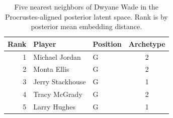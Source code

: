 \begin{table}[htbp]
  \centering\small
  \begin{tabular}{rllc}
    \toprule
    Rank & Player & Position & Archetype \\
    \midrule
    1 & Michael Jordan & G & 2 \\
    2 & Monta Ellis & G & 2 \\
    3 & Jerry Stackhouse & G & 1 \\
    4 & Tracy McGrady & G & 2 \\
    5 & Larry Hughes & G & 1 \\
    \bottomrule
  \end{tabular}
  \caption{Five nearest neighbors of Dwyane Wade in the Procrustes-aligned posterior latent space. Rank is by posterior mean embedding distance.}
  \label{tab:Dwyane_Wade_neighbors}
\end{table}

